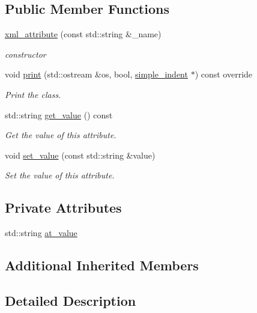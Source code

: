 \subsection*{Public Member Functions}
\begin{DoxyCompactItemize}
\item 
\hyperlink{classxml__attribute_acd1416f7f3d7a255cd2a5ef5636fb820}{xml\+\_\+attribute} (const std\+::string \&\+\_\+name)
\begin{DoxyCompactList}\small\item\em constructor \end{DoxyCompactList}\item 
void \hyperlink{classxml__attribute_a854917ba5c6dcf1ab04d5ef3151cade6}{print} (std\+::ostream \&os, bool, \hyperlink{classsimple__indent}{simple\+\_\+indent} $\ast$) const override
\begin{DoxyCompactList}\small\item\em Print the class. \end{DoxyCompactList}\item 
std\+::string \hyperlink{classxml__attribute_a38547e5c171a59ea5712226b65f5a571}{get\+\_\+value} () const
\begin{DoxyCompactList}\small\item\em Get the value of this attribute. \end{DoxyCompactList}\item 
void \hyperlink{classxml__attribute_a957e710a1b24e0f175a663d4a4ab1ced}{set\+\_\+value} (const std\+::string \&value)
\begin{DoxyCompactList}\small\item\em Set the value of this attribute. \end{DoxyCompactList}\end{DoxyCompactItemize}
\subsection*{Private Attributes}
\begin{DoxyCompactItemize}
\item 
std\+::string \hyperlink{classxml__attribute_ae69b94ad6d9c8f19c7ce8977310961c9}{at\+\_\+value}
\end{DoxyCompactItemize}
\subsection*{Additional Inherited Members}


\subsection{Detailed Description}


